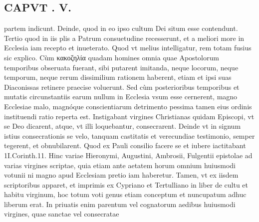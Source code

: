 \documentclass{article}
\begin{document}
\begin{pages}
\section*{CAPVT . V. }
\marginpar{[ p.291 ]}\pstart partem indicunt. Deinde, quod in eo ipso cultum Dei situm esse contendunt. Tertio quod in iis plis a Patrum consuetudine recesserunt, et a meliori more in Ecclesia iam recepto et inueterato.  \pend\pstart Quod vt melius intelligatur, rem totam fusius sic explico. Cùm κακοζηλία quadam homines omnia quae Apostolorum temporibus obseruata fuerant, sibi putarent imitanda, neque locorum, neque temporum, neque rerum dissimilium rationem haberent, etiam et ipsi suas Diaconissas retinere praecise voluerunt. Sed cùm posterioribus temporibus et mutatis circunstantiis earum nullum in Ecclesia vsum esse cernerent, magno Ecclesiae malo, magnóque conscientiarum detrimento pessima tamen eius ordinis instituendi ratio reperta est.  \pend\pstart Instigabant virgines Christianas quidam Episcopi, vt se Deo dicarent, atque, vt illi loquebantur, consecrarent. Deinde vt in signum istius consecrationis se velo, tanquam castitatis et verecundiae testimonio, semper tegerent, et obnubilarent. Quod ex Pauli consilio facere se et iubere iactitabant 1I.Corinth.11. Hinc variae Hieronymi, Augustini, Ambrosii, Fulgentii epistolae ad varias virgines scriptae, quia etiam ante aetatem horum omnium huiusmodi votunii ni magno apud Ecclesiam pretio iam haberetur. Tamen, vt ex iisdem scriptoribus apparet, et imprimis ex Cypriano et Tertulliano in liber  de cultu et habitu virginum, hoc totum voti genus etiam conceptum et nuncupatum adhuc liberum erat. In priuatis enim parentum vel cognatorum aedibus huiusmodi virgines, quae sanctae vel consecratae  \pend

\end{pages}
\end{document}
